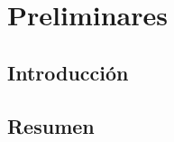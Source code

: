 \chapter[Preliminares]{Preliminares}
\label{cap:preliminares}

\section{Introducci\'on}
\label{sec:preliminares.intro}



%
%
%
%
%
%

\section{Resumen}
\label{sec:preliminares.resumen}